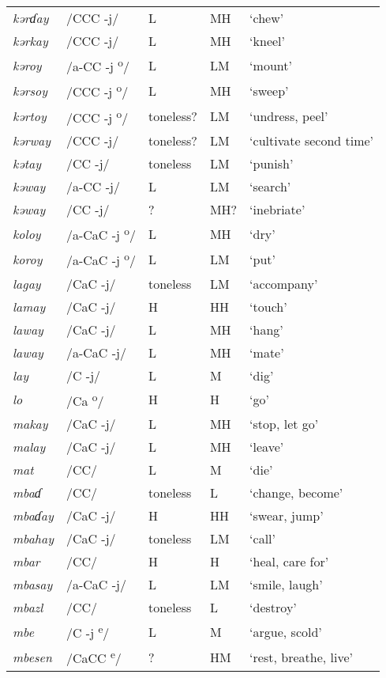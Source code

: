 \begin{small}
\begin{longtable}{lp{1.75cm}p{1.75cm}p{1.75cm}p{3cm}}
\textit{kərɗay} & /CCC -j/ & L & MH & ‘chew’\\
\textit{kərkay} & /CCC -j/ & L & MH & ‘kneel’\\
\textit{kəroy} & /a-CC -j\textsuperscript{ o}/ & L & LM & ‘mount’\\
\textit{kərsoy} & /CCC -j\textsuperscript{ o}/ & L & MH & ‘sweep’\\
\textit{kərtoy} & /CCC -j\textsuperscript{ o}/ & toneless? & LM & ‘undress, peel’\\
\textit{kərway} & /CCC -j/ & toneless? & LM & ‘cultivate second time’\\
\textit{kətay} & /CC -j/ & toneless & LM & ‘punish’\\
\textit{kəway} & /a-CC -j/ & L & LM & ‘search’\\
\textit{kəway} & /CC -j/ & ? & MH? & ‘inebriate’\\
\textit{koloy} & /a-CaC -j\textsuperscript{ o}/ & L & MH & ‘dry’\\
\textit{koroy} & /a-CaC -j\textsuperscript{ o}/ & L & LM & ‘put’\\
\textit{lagay} & /CaC -j/ & toneless & LM & ‘accompany’\\
\textit{lamay} & /CaC -j/ & H & HH & ‘touch’\\
\textit{laway} & /CaC -j/ & L & MH & ‘hang’\\
\textit{laway} & /a-CaC -j/ & L & MH & ‘mate’\\
\textit{lay} & /C -j/ & L & M & ‘dig’\\
\textit{lo} & /Ca \textsuperscript{o}/ & H & H & ‘go’\\
\textit{makay} & /CaC -j/ & L & MH & ‘stop, let go’\\
\textit{malay} & /CaC -j/ & L & MH & ‘leave’\\
\textit{mat} & /CC/ & L & M & ‘die’\\
\textit{mbaɗ} & /CC/ & toneless & L & ‘change, become’\\
\textit{mbaɗay} & /CaC -j/ & H & HH & ‘swear, jump’\\
\textit{mbahay} & /CaC -j/ & toneless & LM & ‘call’\\
\textit{mbar} & /CC/ & H & H & ‘heal, care for’\\
\textit{mbasay} & /a-CaC -j/ & L & LM & ‘smile, laugh’\\
\textit{mbazl} & /CC/ & toneless & L & ‘destroy’\\
\textit{mbe} & /C -j \textsuperscript{e}/ & L & M & ‘argue, scold’\\
\textit{mbesen} & /CaCC \textsuperscript{e}/ & ? & HM & ‘rest, breathe, live’\\

\end{longtable}
\end{small}
